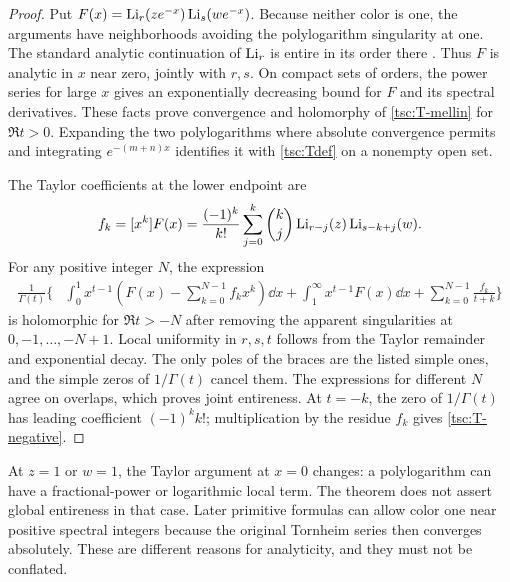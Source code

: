 \begin{proof}
Put $F(x)=\operatorname{Li}_r(ze^{-x})\operatorname{Li}_s(we^{-x})$. Because neither color is one,
the arguments have neighborhoods avoiding the polylogarithm singularity
at one. The standard analytic continuation of $\operatorname{Li}_r$ is entire in its
order there \cite{tsc:dlmf-poly}. Thus $F$ is analytic in $x$ near zero,
jointly with $r,s$. On compact sets of orders, the power series for large
$x$ gives an exponentially decreasing bound for $F$ and its spectral
derivatives. These facts prove convergence and holomorphy of
\eqref{tsc:T-mellin} for $\Re t>0$. Expanding the two polylogarithms where
absolute convergence permits and integrating $e^{-(m+n)x}$ identifies it
with \eqref{tsc:Tdef} on a nonempty open set.

The Taylor coefficients at the lower endpoint are
\begin{equation}\label{tsc:Fcoeff}
 f_k=[x^k]F(x)=\frac{(-1)^k}{k!}
        \sum_{j=0}^k\binom{k}{j}
                   \operatorname{Li}_{r-j}(z)\operatorname{Li}_{s-k+j}(w).
\end{equation}
For any positive integer $N$, the expression
\begin{align}\label{tsc:T-subtracted}
 \frac1{\Gamma(t)}\bigg\{&
  \int_0^1 x^{t-1}\left(F(x)-\sum_{k=0}^{N-1}f_kx^k\right)\dd x
  +\int_1^\infty x^{t-1}F(x)\dd x
  +\sum_{k=0}^{N-1}\frac{f_k}{t+k}\bigg\}
\end{align}
is holomorphic for $\Re t>-N$ after removing the apparent singularities
at $0,-1,\ldots,-N+1$. Local uniformity in $r,s,t$ follows from the Taylor
remainder and exponential decay. The only poles of the braces are the
listed simple ones, and the simple zeros of $1/\Gamma(t)$ cancel them.
The expressions for different $N$ agree on overlaps, which proves joint
entireness. At $t=-k$, the zero of $1/\Gamma(t)$ has leading coefficient
$(-1)^k k!$; multiplication by the residue $f_k$ gives
\eqref{tsc:T-negative}.
\end{proof}

\begin{remark}
At $z=1$ or $w=1$, the Taylor argument at $x=0$ changes: a polylogarithm
can have a fractional-power or logarithmic local term. The theorem does
not assert global entireness in that case. Later primitive formulas can
allow color one near positive spectral integers because the original
Tornheim series then converges absolutely. These are different reasons
for analyticity, and they must not be conflated.
\end{remark}

